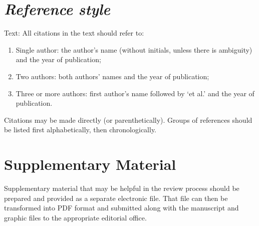 \documentclass[times,twocolumn,final]{elsarticle}
\begin{document}
\section*{\itshape Reference style}

Text: All citations in the text should refer to:
\begin{enumerate}
\item Single author: the author's name (without initials, unless there
is ambiguity) and the year of publication;
\item Two authors: both authors' names and the year of publication;
\item Three or more authors: first author's name followed by `et al.'
and the year of publication.
\end{enumerate}
Citations may be made directly (or parenthetically). Groups of
references should be listed first alphabetically, then chronologically.



\section*{Supplementary Material}

Supplementary material that may be helpful in the review process should
be prepared and provided as a separate electronic file. That file can
then be transformed into PDF format and submitted along with the
manuscript and graphic files to the appropriate editorial office.
\end{document}
